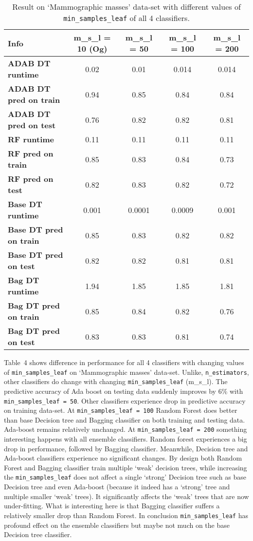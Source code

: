 \documentclass[12pt]{article}
\begin{document}
\begin{table}[!hptb]
\centering
\begin{tabular}{|l|c|c|c|c|}
\hline
\textbf{Info} & \textbf{m\_s\_l = 10 (Og)} & \textbf{m\_s\_l = 50} & \textbf{m\_s\_l = 100} & \textbf{m\_s\_l = 200} \\\hline
\textbf{ADAB DT runtime} & 0.02 & 0.01 & 0.014 & 0.014 \\
\textbf{ADAB DT pred on train} & 0.94 & 0.85 & 0.84 & 0.84 \\
\textbf{ADAB DT pred on test} & 0.76 & 0.82 & 0.82 & 0.81 \\\hline
\textbf{RF runtime} & 0.11 & 0.11 & 0.11 & 0.11 \\
\textbf{RF pred on train} & 0.85 & 0.83 & 0.84 & 0.73 \\
\textbf{RF pred on test} & 0.82 & 0.83 & 0.82 & 0.72 \\\hline
\textbf{Base DT runtime} & 0.001 & 0.0001 & 0.0009 & 0.001 \\
\textbf{Base DT pred on train} & 0.85 & 0.83 & 0.82 & 0.82 \\
\textbf{Base DT pred on test} & 0.82 & 0.82 & 0.81 & 0.81 \\\hline
\textbf{Bag DT runtime} & 1.94 & 1.85 & 1.85 & 1.81 \\
\textbf{Bag DT pred on train} & 0.85 & 0.84 & 0.82 & 0.76 \\
\textbf{Bag DT pred on test} & 0.83 & 0.83 & 0.81 & 0.74 \\\hline
\end{tabular}
\caption{Result on `Mammographic masses' data-set with different values of \texttt{min\_samples\_leaf} of all 4 classifiers.}
\end{table}

Table~4 shows difference in performance for all 4 classifiers with changing values of \texttt{min\_samples\_leaf} on `Mammographic masses' data-set. Unlike, \texttt{n\_estimators}, other classifiers do change with changing \texttt{min\_samples\_leaf} (m\_s\_l). The predictive accuracy of Ada boost on testing data suddenly improves by 6\% with \texttt{min\_samples\_leaf = 50}. Other classifiers experience drop in predictive accuracy on training data-set. At \texttt{min\_samples\_leaf = 100} Random Forest does better than base Decision tree and Bagging classifier on both training and testing data. Ada-boost remains relatively unchanged. At \texttt{min\_samples\_leaf = 200} something interesting happens with all ensemble classifiers. Random forest experiences a big drop in performance, followed by Bagging classifier. Meanwhile, Decision tree and Ada-boost classifiers experience no significant changes. By design both Random Forest and Bagging classifier train multiple `weak' decision trees, while increasing the \texttt{min\_samples\_leaf} does not affect a single `strong' Decision tree such as base Decision tree and even Ada-boost (because it indeed has a `strong' tree and multiple smaller `weak' trees). It significantly affects the `weak' trees that are now under-fitting. What is interesting here is that Bagging classifier suffers a relatively smaller drop than Random Forest. In conclusion \texttt{min\_samples\_leaf} has profound effect on the ensemble classifiers but maybe not much on the base Decision tree classifier.
\end{document}
